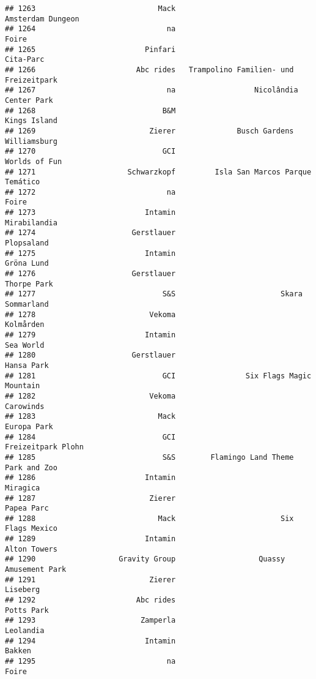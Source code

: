 \documentclass[
]{article}
\begin{document}
\begin{verbatim}
## 1263                            Mack                       Amsterdam Dungeon
## 1264                              na                                   Foire
## 1265                         Pinfari                               Cita-Parc
## 1266                       Abc rides   Trampolino Familien- und Freizeitpark
## 1267                              na                  Nicolândia Center Park
## 1268                             B&M                            Kings Island
## 1269                          Zierer              Busch Gardens Williamsburg
## 1270                             GCI                           Worlds of Fun
## 1271                     Schwarzkopf         Isla San Marcos Parque Temático
## 1272                              na                                   Foire
## 1273                         Intamin                            Mirabilandia
## 1274                      Gerstlauer                              Plopsaland
## 1275                         Intamin                              Gröna Lund
## 1276                      Gerstlauer                             Thorpe Park
## 1277                             S&S                        Skara Sommarland
## 1278                          Vekoma                               Kolmården
## 1279                         Intamin                               Sea World
## 1280                      Gerstlauer                              Hansa Park
## 1281                             GCI                Six Flags Magic Mountain
## 1282                          Vekoma                               Carowinds
## 1283                            Mack                             Europa Park
## 1284                             GCI                      Freizeitpark Plohn
## 1285                             S&S        Flamingo Land Theme Park and Zoo
## 1286                         Intamin                                Miragica
## 1287                          Zierer                              Papea Parc
## 1288                            Mack                        Six Flags Mexico
## 1289                         Intamin                            Alton Towers
## 1290                   Gravity Group                   Quassy Amusement Park
## 1291                          Zierer                                Liseberg
## 1292                       Abc rides                              Potts Park
## 1293                        Zamperla                               Leolandia
## 1294                         Intamin                                  Bakken
## 1295                              na                                   Foire

\end{verbatim}
\end{document}
